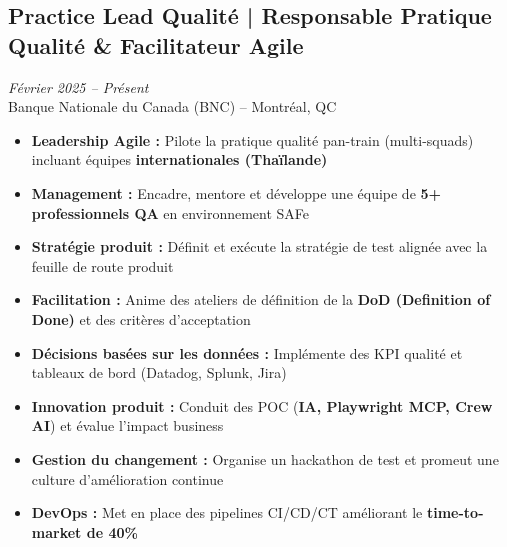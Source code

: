 \documentclass[11pt,a4paper]{article}
\newcommand{\highlight}[1]{\textcolor{primaryblue}{\textbf{#1}}}
\newcommand{\keypoint}[1]{\textbf{#1}}
\begin{document}
\subsection*{Practice Lead Qualité | Responsable Pratique Qualité \& Facilitateur Agile} \hfill \textit{\color{mediumgray}Février 2025 -- Présent}\\
Banque Nationale du Canada (BNC) -- Montréal, QC
\begin{itemize}[leftmargin=22pt]
    \item \highlight{Leadership Agile :} Pilote la pratique qualité pan-train (multi-squads) incluant équipes \textbf{internationales (Thaïlande)}
    \item \highlight{Management :} Encadre, mentore et développe une équipe de \keypoint{5+ professionnels QA} en environnement SAFe
    \item \highlight{Stratégie produit :} Définit et exécute la stratégie de test alignée avec la feuille de route produit
    \item \highlight{Facilitation :} Anime des ateliers de définition de la \textbf{DoD (Definition of Done)} et des critères d'acceptation
    \item \highlight{Décisions basées sur les données :} Implémente des KPI qualité et tableaux de bord (Datadog, Splunk, Jira)
    \item \highlight{Innovation produit :} Conduit des POC (\textbf{IA, Playwright MCP, Crew AI}) et évalue l'impact business
    \item \highlight{Gestion du changement :} Organise un hackathon de test et promeut une culture d'amélioration continue
    \item \highlight{DevOps :} Met en place des pipelines CI/CD/CT améliorant le \keypoint{time-to-market de 40\%}
\end{itemize}
\end{document}
